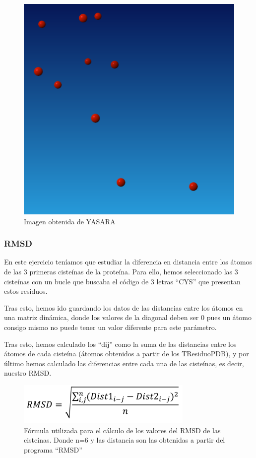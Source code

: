 \documentclass[12pt]{article}
\begin{document}
\begin{figure}[H]
\centering
\includegraphics[scale=0.5]{Screenshot_37}
\caption{Imagen obtenida de YASARA}
\end{figure}


\subsubsection{RMSD}

En este ejercicio teníamos que estudiar la diferencia en distancia entre los átomos de las 3 primeras cisteínas de la proteína. Para ello, hemos seleccionado las 3 cisteínas con un bucle que buscaba el código de 3 letras ``CYS'' que presentan estos residuos.
\newline

Tras esto, hemos ido guardando los datos de las distancias entre los átomos en una matriz dinámica, donde los valores de la diagonal deben ser 0 pues un átomo consigo mismo no puede tener un valor diferente para este parámetro.
\newline

Tras esto, hemos calculado los ``dij'' como la suma de las distancias entre los átomos de cada cisteína (átomos obtenidos a partir de los TResiduoPDB), y por último hemos calculado las diferencias entre cada una de las cisteínas, es decir, nuestro RMSD.
\newline

\begin{figure}[H]
\centering
\includegraphics[scale=0.8]{formula1}
\caption{Fórmula utilizada para el cálculo de los valores del RMSD de las cisteínas. Donde n=6 y las distancia son las obtenidas a partir del programa ``RMSD''}
\end{figure}
\end{document}

